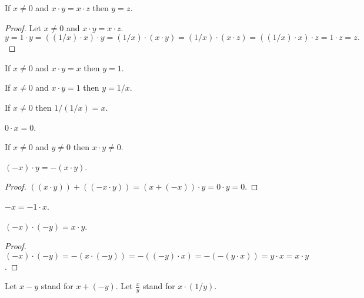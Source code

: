 \documentclass{article}
\begin{document}
\begin{forthel}
\begin{proposition}[title=1 15 a]
If $x \neq 0$ and $x \cdot y = x \cdot z$
then $y = z$.
\end{proposition}
\begin{proof}
Let $x \neq 0$ and $x \cdot y = x \cdot z$.
\[ y = 1 \cdot y = ((1/x) \cdot x) \cdot y = (1/x) \cdot (x \cdot y) =
(1/x) \cdot (x \cdot z) = ((1/x) \cdot x) \cdot z = 1 \cdot z = z. \]
\end{proof}

\begin{proposition}[title=1 15 b]
If $x \neq 0$ and $x \cdot y = x$ then $y = 1$.
\end{proposition}

\begin{proposition}[title=1 15 c]
If $x \neq 0$ and $x \cdot y = 1$ then $y = 1/x$.
\end{proposition}

\begin{proposition}[title=1 15 d]
If $x \neq 0$ then $1/(1/x) = x$.
\end{proposition}

\begin{proposition}[title=1 16 a]
$0 \cdot x = 0$.
\end{proposition}

\begin{proposition}[title=1 16 b]
If $x \neq 0$ and $y \neq 0$ then $x \cdot y \neq 0$.
\end{proposition}

\begin{proposition}[title=1 16 c]
$(-x) \cdot y = -(x \cdot y)$.
\end{proposition}
\begin{proof}
$((x \cdot y)) + ((-x \cdot y)) = (x + (-x)) \cdot y
= 0 \cdot y = 0$.
\end{proof}

\begin{proposition}
$-x = -1 \cdot x$.
\end{proposition}

\begin{proposition}[title=1 16d]
$(-x) \cdot (-y) = x \cdot y$.
\end{proposition}
\begin{proof}
$(-x)\cdot (-y) = -(x\cdot(-y)) = -((-y)\cdot x) =
-(-(y\cdot x)) = y\cdot x = x\cdot y$.
\end{proof}

Let $x - y$ stand for $x + (-y)$.
Let $\frac{x}{y}$ stand for $x \cdot (1/y)$.

\end{forthel}
\end{document}
